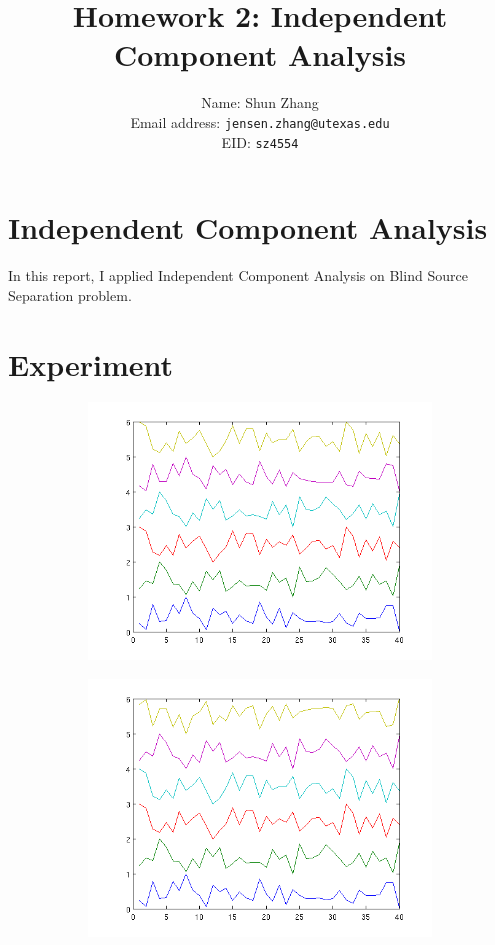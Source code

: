 \documentclass[10pt]{article}
\title{Homework 2: Independent Component Analysis}
\author{Name: Shun Zhang\\
Email address: \texttt{jensen.zhang@utexas.edu}\\
EID: \texttt{sz4554}}
\date{}
\begin{document}
\maketitle

\section{Independent Component Analysis}

In this report, I applied Independent Component Analysis on Blind Source
Separation problem.

\section{Experiment}

\begin{figure}[h]
\centering
\begin{subfigure}{0.49\textwidth}
	\includegraphics[width=\textwidth]{rep5.png}
\end{subfigure}
\begin{subfigure}{0.49\textwidth}
	\includegraphics[width=\textwidth]{rep4.png}

\end{subfigure}
\end{figure}
\end{document}
